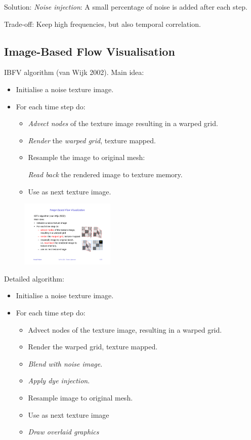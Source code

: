 Solution: \emph{Noise injection}: A small percentage of noise is added after each step. 

Trade-off: Keep high frequencies, but also temporal correlation.

\subsection{Image-Based Flow Visualisation}
IBFV algorithm (van Wijk 2002). Main idea:
\begin{itemize}
    \item Initialise a noise texture image.
    \item For each time step do:
        \begin{itemize}
            \item \emph{Advect nodes} of the texture image resulting in a warped grid.
            \item \emph{Render} the \emph{warped grid}, texture mapped.
            \item Resample the image to original mesh: 
            
                \emph{Read back} the rendered image to texture memory.
            \item Use as next texture image. 
        \end{itemize}
\end{itemize}
\begin{figure}[H]
    \centering
    \includegraphics[width=0.4\textwidth]{img/06_ibfv}
\end{figure}


Detailed algorithm:
\begin{itemize}
    \item Initialise a noise texture image.
    \item For each time step do:
        \begin{itemize}
            \item Advect nodes of the texture image, resulting in a warped grid.
            \item Render the warped grid, texture mapped.
            \item \emph{Blend with noise image}.
            \item \emph{Apply dye injection}.
            \item Resample image to original mesh.
            \item Use as next texture image
            \item \emph{Draw overlaid graphics}
        \end{itemize}
\end{itemize}

